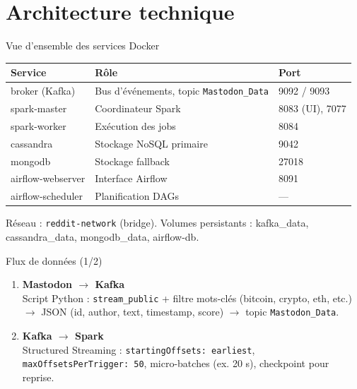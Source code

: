 \documentclass[11pt,aspectratio=169]{beamer}
\begin{document}
\section{Architecture technique}

\begin{frame}{Vue d'ensemble des services Docker}
  \begin{center}
    \small
    \begin{tabular}{@{}lll@{}}
      \toprule
      \textbf{Service} & \textbf{Rôle} & \textbf{Port} \\
      \midrule
      broker (Kafka) & Bus d'événements, topic \texttt{Mastodon\_Data} & 9092 / 9093 \\
      spark-master & Coordinateur Spark & 8083 (UI), 7077 \\
      spark-worker & Exécution des jobs & 8084 \\
      cassandra & Stockage NoSQL primaire & 9042 \\
      mongodb & Stockage fallback & 27018 \\
      airflow-webserver & Interface Airflow & 8091 \\
      airflow-scheduler & Planification DAGs & --- \\
      \bottomrule
    \end{tabular}
  \end{center}
  \vspace{0.5em}
  Réseau : \texttt{reddit-network} (bridge). Volumes persistants : kafka\_data, cassandra\_data, mongodb\_data, airflow-db.
\end{frame}

\begin{frame}{Flux de données (1/2)}
  \begin{enumerate}[leftmargin=*]
    \item \textbf{Mastodon $\rightarrow$ Kafka} \\
    Script Python : \texttt{stream\_public} + filtre mots-clés (bitcoin, crypto, eth, etc.) $\rightarrow$ JSON (id, author, text, timestamp, score) $\rightarrow$ topic \texttt{Mastodon\_Data}.
    \item \textbf{Kafka $\rightarrow$ Spark} \\
    Structured Streaming : \texttt{startingOffsets: earliest}, \texttt{maxOffsetsPerTrigger: 50}, micro-batches (ex. 20 s), checkpoint pour reprise.
  \end{enumerate}
\end{frame}
\end{document}
